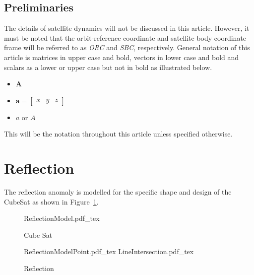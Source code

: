 \documentclass[letterpaper, 10 pt, conference]{ieeeconf}  %
\begin{document}
\subsection{Preliminaries}
The details of satellite dynamics will not be discussed in this article. However, it must be noted that the orbit-reference coordinate and satellite body coordinate frame will be referred to as \emph{ORC} and \emph{SBC}, respectively. General notation of this article is matrices in upper case and bold, vectors in lower case and bold and scalars as a lower or upper case but not in bold as illustrated below.
\begin{itemize}
	\item{ $\mathbf{A}$}
	\item{ $\mathbf{a} = \begin{bmatrix} 
		x & y & z
		\end{bmatrix}$}
	\item{ $a$ or $A$}
\end{itemize}

This will be the notation throughout this article unless specified otherwise. 

\section{Reflection}
\label{section:Reflection}
The reflection anomaly is modelled for the specific shape and design of the CubeSat as shown in Figure~\ref{fig:CubeSat}.

\begin{figure}[!htb]
	\centering
	\def\svgwidth{7cm}
	{ReflectionModel.pdf_tex}
	\caption{Cube Sat}
	\label{fig:CubeSat}
\end{figure}

\begin{figure}[!hbt]
	\centering
	\def\svgwidth{7cm}
	{ReflectionModelPoint.pdf_tex}
	\centering
	\def\svgwidth{7cm}
	{LineIntersection.pdf_tex}
	\caption{Reflection}
	\label{fig:LineIntersection}
\end{figure}
\end{document}
